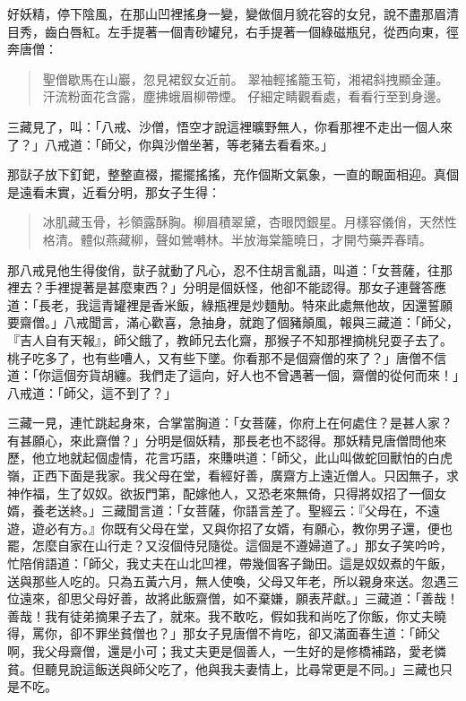 好妖精，停下陰風，在那山凹裡搖身一變，變做個月貌花容的女兒，說不盡那眉清目秀，齒白唇紅。左手提著一個青砂罐兒，右手提著一個綠磁瓶兒，從西向東，徑奔唐僧：
\begin{quote}
聖僧歇馬在山巖，忽見裙釵女近前。
翠袖輕搖籠玉筍，湘裙斜拽顯金蓮。
汗流粉面花含露，塵拂蛾眉柳帶煙。
仔細定睛觀看處，看看行至到身邊。
\end{quote}

三藏見了，叫：「八戒、沙僧，悟空才說這裡曠野無人，你看那裡不走出一個人來了？」八戒道：「師父，你與沙僧坐著，等老豬去看看來。」

那獃子放下釘鈀，整整直裰，擺擺搖搖，充作個斯文氣象，一直的靦面相迎。真個是遠看未實，近看分明，那女子生得：
\begin{quote}
冰肌藏玉骨，衫領露酥胸。柳眉積翠黛，杏眼閃銀星。月樣容儀俏，天然性格清。體似燕藏柳，聲如鶯囀林。半放海棠籠曉日，才開芍藥弄春晴。
\end{quote}

那八戒見他生得俊俏，獃子就動了凡心，忍不住胡言亂語，叫道：「女菩薩，往那裡去？手裡提著是甚麼東西？」分明是個妖怪，他卻不能認得。那女子連聲答應道：「長老，我這青罐裡是香米飯，綠瓶裡是炒麵觔。特來此處無他故，因還誓願要齋僧。」八戒聞言，滿心歡喜，急抽身，就跑了個豬顛風，報與三藏道：「師父，『吉人自有天報』，師父餓了，教師兄去化齋，那猴子不知那裡摘桃兒耍子去了。桃子吃多了，也有些嘈人，又有些下墜。你看那不是個齋僧的來了？」唐僧不信道：「你這個夯貨胡纏。我們走了這向，好人也不曾遇著一個，齋僧的從何而來！」八戒道：「師父，這不到了？」

三藏一見，連忙跳起身來，合掌當胸道：「女菩薩，你府上在何處住？是甚人家？有甚願心，來此齋僧？」分明是個妖精，那長老也不認得。那妖精見唐僧問他來歷，他立地就起個虛情，花言巧語，來賺哄道：「師父，此山叫做蛇回獸怕的白虎嶺，正西下面是我家。我父母在堂，看經好善，廣齋方上遠近僧人。只因無子，求神作福，生了奴奴。欲扳門第，配嫁他人，又恐老來無倚，只得將奴招了一個女婿，養老送終。」三藏聞言道：「女菩薩，你語言差了。聖經云：『父母在，不遠遊，遊必有方。』你既有父母在堂，又與你招了女婿，有願心，教你男子還，便也罷，怎麼自家在山行走？又沒個侍兒隨從。這個是不遵婦道了。」那女子笑吟吟，忙陪俏語道：「師父，我丈夫在山北凹裡，帶幾個客子鋤田。這是奴奴煮的午飯，送與那些人吃的。只為五黃六月，無人使喚，父母又年老，所以親身來送。忽遇三位遠來，卻思父母好善，故將此飯齋僧，如不棄嫌，願表芹獻。」三藏道：「善哉！善哉！我有徒弟摘果子去了，就來。我不敢吃，假如我和尚吃了你飯，你丈夫曉得，罵你，卻不罪坐貧僧也？」那女子見唐僧不肯吃，卻又滿面春生道：「師父啊，我父母齋僧，還是小可；我丈夫更是個善人，一生好的是修橋補路，愛老憐貧。但聽見說這飯送與師父吃了，他與我夫妻情上，比尋常更是不同。」三藏也只是不吃。

